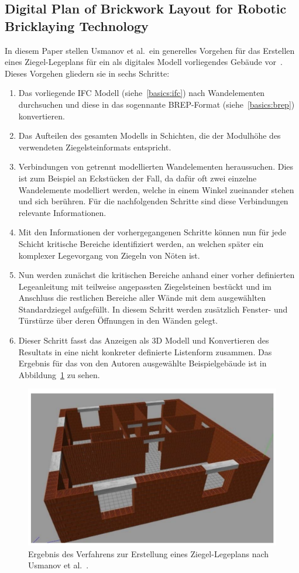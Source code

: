 \subsection{Digital Plan of Brickwork Layout for Robotic Bricklaying Technology}\label{related:digital_plan_of_brickwork_layout}
In diesem Paper stellen Usmanov et al.\ ein generelles Vorgehen für das Erstellen eines Ziegel-Legeplans für ein als digitales Modell vorliegendes Gebäude vor~\cite{Usmanov2021}.
Dieses Vorgehen gliedern sie in sechs Schritte:
\begin{enumerate}
\item Das vorliegende IFC Modell (siehe~\ref{basics:ifc}) nach Wandelementen durchsuchen und diese in das sogennante BREP-Format (siehe~\ref{basics:brep}) konvertieren.
\item Das Aufteilen des gesamten Modells in Schichten, die der Modulhöhe des verwendeten Ziegelsteinformats entspricht.
\item Verbindungen von getrennt modellierten Wandelementen heraussuchen. Dies ist zum Beispiel an Eckstücken der Fall, da dafür oft zwei einzelne Wandelemente modelliert werden, welche in einem Winkel zueinander stehen und sich berühren. Für die nachfolgenden Schritte sind diese Verbindungen relevante Informationen.
\item Mit den Informationen der vorhergegangenen Schritte können nun für jede Schicht kritische Bereiche identifiziert werden, an welchen später ein komplexer Legevorgang von Ziegeln von Nöten ist.
\item Nun werden zunächst die kritischen Bereiche anhand einer vorher definierten Legeanleitung mit teilweise angepassten Ziegelsteinen bestückt und im Anschluss die restlichen Bereiche aller Wände mit dem ausgewählten Standardziegel aufgefüllt. In diesem Schritt werden zusätzlich Fenster- und Türstürze über deren Öffnungen in den Wänden gelegt.
\item Dieser Schritt fasst das Anzeigen als 3D Modell und Konvertieren des Resultats in eine nicht konkreter definierte Listenform zusammen. Das Ergebnis für das von den Autoren ausgewählte Beispielgebäude ist in Abbildung~\ref{fig:related:usmanov} zu sehen.
\end{enumerate}

\begin{figure}[ht]
    \centering
    \includegraphics[width=0.6\columnwidth]{fig/sustainability-13-03905-g004.png}
    \caption{Ergebnis des Verfahrens zur Erstellung eines Ziegel-Legeplans nach Usmanov et al.~\cite{Usmanov2021}.}\label{fig:related:usmanov}
\end{figure}

